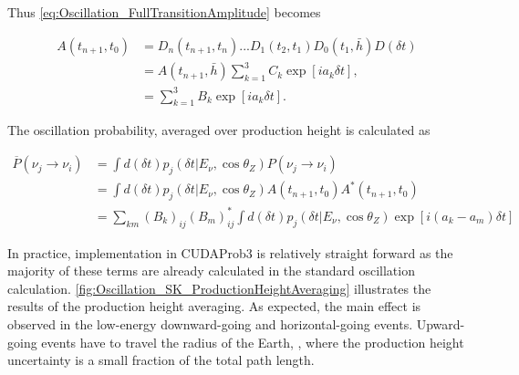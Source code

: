 Thus \autoref{eq:Oscillation_FullTransitionAmplitude} becomes

\begin{equation}
  \begin{split}
    A(t_{n+1},t_{0}) &= D_{n}(t_{n+1},t_{n})...D_{1}(t_{2},t_{1})D_{0}(t_{1},\bar{h})D(\delta t) \\
    &= A(t_{n+1},\bar{h}) \sum_{k=1}^{3} C_{k} \exp[ia_{k} \delta t], \\
    &= \sum_{k=1}^{3} B_{k} \exp[ia_{k} \delta t].
  \end{split}
\end{equation}

The oscillation probability, averaged over production height is calculated as

\begin{equation}
  \begin{split}
    \overline P(\nu_{j} \rightarrow \nu_{i}) &= \int d(\delta t) p_{j}(\delta t|E_{\nu}, \cos\theta_{Z}) P(\nu_{j} \rightarrow \nu_{i}) \\
    &= \int d(\delta t) p_{j}(\delta t|E_{\nu}, \cos\theta_{Z})	A(t_{n+1},t_{0}) A^{*}(t_{n+1},t_{0}) \\
    &= \sum_{km} (B_{k})_{ij} (B_{m})^{*}_{ij} \int d(\delta t) p_{j}(\delta t|E_{\nu}, \cos\theta_{Z}) \exp[i(a_{k}-a_{m})\delta t]
  \end{split}
\end{equation}

In practice, implementation in CUDAProb3 \cite{cudaprob3} is relatively straight forward as the majority of these terms are already calculated in the standard oscillation calculation. \autoref{fig:Oscillation_SK_ProductionHeightAveraging} illustrates the results of the production height averaging. As expected, the main effect is observed in the low-energy downward-going and horizontal-going events. Upward-going events have to travel the radius of the Earth, , where the production height uncertainty is a small fraction of the total path length. 

